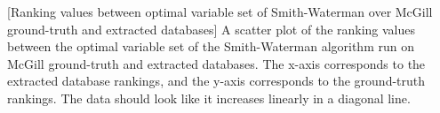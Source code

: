 [Ranking values between optimal variable set of Smith-Waterman over McGill ground-truth and extracted databases] A scatter plot of the ranking values between the optimal variable set of the Smith-Waterman algorithm run on McGill ground-truth and extracted databases. The x-axis corresponds to the extracted database rankings, and the y-axis corresponds to the ground-truth rankings. The data should look like it increases linearly in a diagonal line.